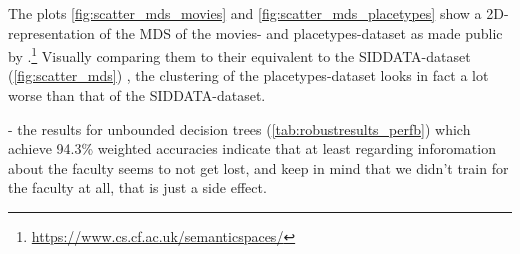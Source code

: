 	
	












The plots \ref{fig:scatter_mds_movies} and \ref{fig:scatter_mds_placetypes} show a 2D-representation of the MDS %
of the movies- and placetypes-dataset as made public by \textcite{Derrac2015}.\footnote{\url{https://www.cs.cf.ac.uk/semanticspaces/}} Visually comparing them to their equivalent to the SIDDATA-dataset (\autoref{fig:scatter_mds}) , the clustering of the placetypes-dataset looks in fact a lot worse than that of the SIDDATA-dataset.








 - the results for unbounded decision trees (\autoref{tab:robustresults_perfb}) which achieve 94.3\% weighted accuracies indicate that at least regarding inforomation about the faculty seems to not get lost, and keep in mind that we didn't train for the faculty at all, that is just a side effect.


